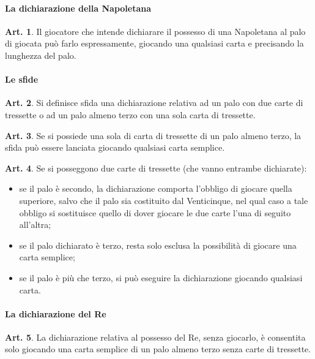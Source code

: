 \documentclass[italian,a4paper]{book}
\theoremstyle{definition}
\newtheorem{art}{Art.}
\newenvironment{packeditem}{
\begin{itemize}
  \setlength{\itemsep}{1pt}
  \setlength{\parskip}{0pt}
  \setlength{\parsep}{0pt}
}{\end{itemize}}
\begin{document}
\paragraph{La dichiarazione della Napoletana}
\begin{art}
    Il giocatore che intende dichiarare il possesso di una Napoletana al palo di giocata può farlo espressamente, giocando una qualsiasi carta e precisando la lunghezza del palo.
\end{art}
\paragraph{Le sfide}
\begin{art}
    Si definisce sfida una dichiarazione relativa ad un palo con due carte di tressette o ad un palo almeno terzo con una sola carta di tressette.
\end{art}
\begin{art}
    Se si possiede una sola di carta di tressette di un palo almeno terzo, la sfida può essere lanciata giocando qualsiasi carta semplice.
\end{art}
\begin{art}
    Se si posseggono due carte di tressette (che vanno entrambe dichiarate):
    \begin{packeditem}
\item se il palo è secondo, la dichiarazione comporta l'obbligo di giocare quella superiore, salvo che il palo sia costituito dal Venticinque, nel qual caso a tale obbligo si sostituisce quello di dover giocare le due carte l'una di seguito all'altra;
\item se il palo dichiarato è terzo, resta solo esclusa la possibilità di giocare una carta semplice;
\item  se il palo è più che terzo, si può eseguire la dichiarazione giocando qualsiasi carta. 
    \end{packeditem}
\end{art}
\paragraph{La dichiarazione del Re}
\begin{art}
    La dichiarazione relativa al possesso del Re, senza giocarlo, è consentita solo giocando una carta semplice di un palo almeno terzo senza carte di tressette.
\end{art}
\end{document}
